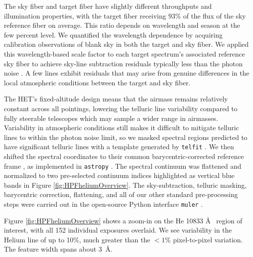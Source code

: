 \documentclass[twocolumn]{aastex631}
\begin{document}
The sky fiber and target fiber have slightly different throughputs and illumination properties, with the target fiber receiving $93\%$ of the flux of the sky reference fiber on average.  This ratio depends on wavelength and season at the few percent level.  We quantified the wavelength dependence by acquiring calibration observations of blank sky in both the target and sky fiber.  We applied this wavelength-based scale factor to each target spectrum's associated reference sky fiber to achieve sky-line subtraction residuals typically less than the photon noise \citep{2022JOSS....7.4302G}.  A few lines exhibit residuals that may arise from genuine differences in the local atmospheric conditions between the target and sky fiber.

The HET's fixed-altitude design means that the airmass remains relatively constant across all pointings, lowering the telluric line variability compared to fully steerable telescopes which may sample a wider range in airmasses.  Variability in atmospheric conditions still makes it difficult to mitigate telluric lines to within the photon noise limit, so we masked spectral regions predicted to have significant telluric lines with a template generated by \texttt{telfit} \citep{2014AJ....148...53G}.  We then shifted the spectral coordinates to their common barycentric-corrected reference frame \citep{2014PASP..126..838W}, as implemented in \texttt{astropy} \citep{2013A&A...558A..33A,2018AJ....156..123A,2022ApJ...935..167A}.  The spectral continuum was flattened and normalized to two pre-selected continuum indices highlighted as vertical blue bands in Figure \ref{fig:HPFheliumOverview}.  The sky-subtraction, telluric masking, barycentric correction, flattening, and all of our other standard pre-processing steps were carried out in the open-source Python interface \texttt{muler} \citep{2022JOSS....7.4302G}.

Figure \ref{fig:HPFheliumOverview} shows a zoom-in on the He 10833 \AA~ region of interest, with all 152 individual exposures overlaid.  We see variability in the Helium line of up to 10\%, much greater than the $<1\%$ pixel-to-pixel variation.  The feature width spans about 3~\AA.
\end{document}
